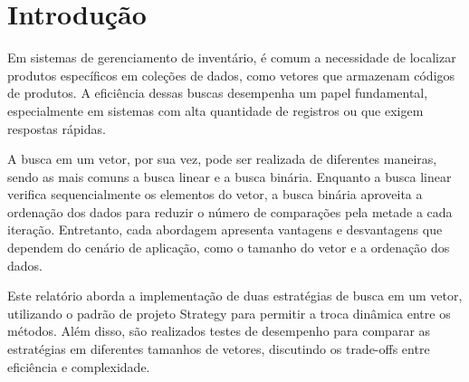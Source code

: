 \section{Introdução}

Em sistemas de gerenciamento de inventário, é comum a necessidade
de localizar produtos específicos em coleções de dados, como vetores
que armazenam códigos de produtos. A eficiência dessas buscas desempenha
um papel fundamental, especialmente em sistemas com alta quantidade 
de registros ou que exigem respostas rápidas.

A busca em um vetor, por sua vez, pode ser realizada de diferentes maneiras,
sendo as mais comuns a busca linear e a busca binária. Enquanto a busca linear
verifica sequencialmente os elementos do vetor, a busca binária aproveita a
ordenação dos dados para reduzir o número de comparações pela metade a cada iteração.
Entretanto, cada abordagem apresenta vantagens e desvantagens que dependem do cenário 
de aplicação, como o tamanho do vetor e a ordenação dos dados.

Este relatório aborda a implementação de duas estratégias de busca em um vetor,
utilizando o padrão de projeto Strategy para permitir a troca dinâmica 
entre os métodos. Além disso, são realizados testes de desempenho para comparar 
as estratégias em diferentes tamanhos de vetores, discutindo os trade-offs entre 
eficiência e complexidade.